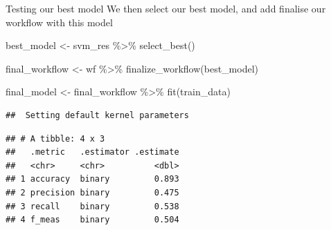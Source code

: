 \documentclass[
  10pt,
  ignorenonframetext,
  aspectratio=169]{beamer}
\newenvironment{Shaded}{\begin{snugshade}}{\end{snugshade}}
\newcommand{\AttributeTok}[1]{\textcolor[rgb]{0.80,0.80,0.80}{#1}}
\newcommand{\FunctionTok}[1]{\textcolor[rgb]{0.94,0.94,0.56}{#1}}
\newcommand{\NormalTok}[1]{\textcolor[rgb]{0.80,0.80,0.80}{#1}}
\newcommand{\OtherTok}[1]{\textcolor[rgb]{0.94,0.94,0.56}{#1}}
\newcommand{\SpecialCharTok}[1]{\textcolor[rgb]{0.86,0.64,0.64}{#1}}
\newcommand{\StringTok}[1]{\textcolor[rgb]{0.80,0.58,0.58}{#1}}
\begin{document}
\begin{frame}[fragile]{Testing our best model}
\protect\hypertarget{testing-our-best-model}{}
We then select our best model, and add finalise our workflow with this
model

\medskip
\scriptsize

\begin{Shaded}
\begin{Highlighting}[]
\NormalTok{best\_model }\OtherTok{\textless{}{-}}\NormalTok{ svm\_res }\SpecialCharTok{\%\textgreater{}\%} \FunctionTok{select\_best}\NormalTok{()}

\NormalTok{final\_workflow }\OtherTok{\textless{}{-}}\NormalTok{ wf }\SpecialCharTok{\%\textgreater{}\%} 
  \FunctionTok{finalize\_workflow}\NormalTok{(best\_model)}

\NormalTok{final\_model }\OtherTok{\textless{}{-}}\NormalTok{ final\_workflow }\SpecialCharTok{\%\textgreater{}\%}
  \FunctionTok{fit}\NormalTok{(train\_data)}
\end{Highlighting}
\end{Shaded}

\begin{verbatim}
##  Setting default kernel parameters
\end{verbatim}

\begin{Shaded}
\end{Shaded}

\begin{verbatim}
## # A tibble: 4 x 3
##   .metric   .estimator .estimate
##   <chr>     <chr>          <dbl>
## 1 accuracy  binary         0.893
## 2 precision binary         0.475
## 3 recall    binary         0.538
## 4 f_meas    binary         0.504
\end{verbatim}
\end{frame}
\end{document}

